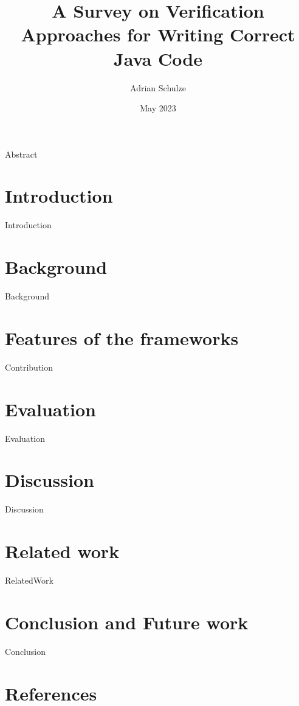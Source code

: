 \documentclass[sigconf]{acmart}
\title{A Survey on Verification Approaches for Writing Correct Java Code}
\author{Adrian Schulze}
\date{May 2023}
\affiliation{\institution{Otto-von-Guericke University} \city{Magdeburg} \country{Germany}}
\begin{document}
	 {Abstract}
	 \maketitle
	 \section{Introduction}{Introduction}
	 \section{Background}{Background}
     \section{Features of the frameworks}{Contribution}
	 \section{Evaluation}{Evaluation}
	 \section{Discussion}{Discussion}
	 \section{Related work} {RelatedWork}
	 \section{Conclusion and Future work} {Conclusion}
	 \newpage
	 \section{References}
	 
{}

\end{document}
